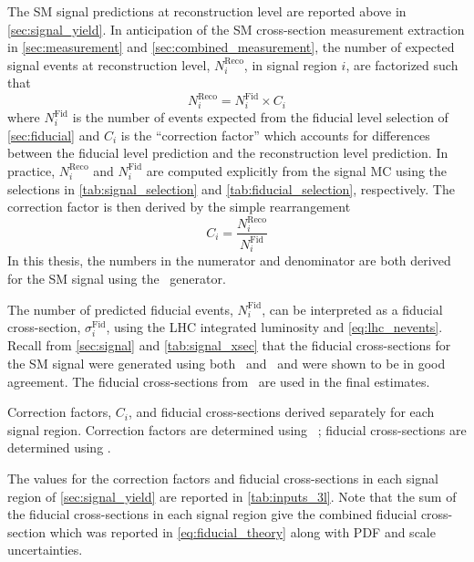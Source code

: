 The SM signal predictions at reconstruction level 
are reported above in \sec\ref{sec:signal_yield}.
In anticipation of the SM cross-section measurement extraction
in \sec\ref{sec:measurement} and \sec\ref{sec:combined_measurement}, 
the number of expected signal events 
at reconstruction level, $N^{\textrm{Reco}}_i$, in signal region $i$,
are factorized such that
\begin{equation}
N^{\textrm{Reco}}_i = N^{\textrm{Fid}}_i \times C_i
\end{equation}
where $N^{\textrm{Fid}}_i$
is the number of events expected from the fiducial
level selection of \sec\ref{sec:fiducial} and 
$C_i$ is the ``correction factor'' which 
accounts for differences between the fiducial level prediction
and the reconstruction level prediction.
In practice, $N^{\textrm{Reco}}_i$ and $N^{\textrm{Fid}}_i$
are computed explicitly from the signal MC using the selections
in \tab\ref{tab:signal_selection} and \tab\ref{tab:fiducial_selection},
respectively.  The correction factor is then derived by the simple rearrangement
\begin{equation}
\label{eq:cfactor}
C_i = \frac{N_i^{\textrm{Reco}}}{N_i^{\textrm{Fid}}}
\end{equation}
In this thesis, the numbers in the numerator and denominator are both derived for the SM
signal using the \vbfnlo~generator.


The number of predicted fiducial events, $N^{\textrm{Fid}}_i$,
can be interpreted as a fiducial cross-section, $\sigma^{\textrm{Fid}}_i$,
using the LHC integrated luminosity and \eqn\eqref{eq:lhc_nevents}.
Recall from \sec\ref{sec:signal} and \tab\ref{tab:signal_xsec}
that the fiducial cross-sections for the SM signal were generated using
both \madgraph~and \vbfnlo~and were shown to be in good agreement.
The fiducial cross-sections from \madgraph~are used in the final
estimates.


\begin{table}[ht!]
\centering

\caption{Correction factors, $C_i$, and fiducial cross-sections derived
separately for each signal region. Correction factors are determined
using \vbfnlo~; fiducial cross-sections are determined
using \madgraph.}
\label{tab:inputs_3l}
\end{table}

The values for the correction factors and fiducial cross-sections
in each signal region of \sec\ref{sec:signal_yield}
are reported in \tab\ref{tab:inputs_3l}.
Note that the sum of the fiducial cross-sections
in each signal region give the combined fiducial cross-section
which was reported in \eqn\ref{eq:fiducial_theory} along with 
PDF and scale uncertainties.



